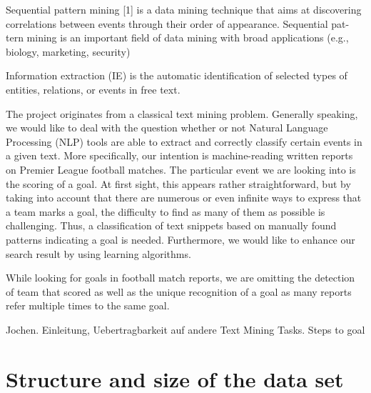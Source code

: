 \documentclass[11pt,titlepage,oneside,openany]{book}
\begin{document}
Sequential pattern mining [1] is a data mining technique that aims at discovering
correlations between events through their order of appearance. Sequential pat-
tern mining is an important ﬁeld of data mining with broad applications (e.g.,
biology, marketing, security) \citep[p.1]{Cellier2010}

Information extraction (IE) is the automatic identification of selected types of entities, relations, or events in free text. \citep[p.545]{Grishman2005}

The project originates from a classical text mining problem. Generally speaking, we would like to deal with the question whether or not Natural Language Processing (NLP) tools are able to extract and correctly classify certain events in a given text. More specifically, our intention is machine-reading written reports on Premier League football matches. The particular event we are looking into is the scoring of a goal. At first sight, this appears rather straightforward, but by taking into account that there are numerous or even infinite ways to express that a team marks a goal, the difficulty to find as many of them as possible is challenging. Thus, a classification of text snippets based on manually found patterns indicating a goal is needed. Furthermore, we would like to enhance our search result by using learning algorithms.  

While looking for goals in football match reports, we are omitting the detection of team that scored as well as the unique recognition of a goal as many reports refer multiple times to the same goal.

Jochen. Einleitung, Uebertragbarkeit auf andere Text Mining Tasks. Steps to goal

\section{Structure and size of the data set}
\end{document}
